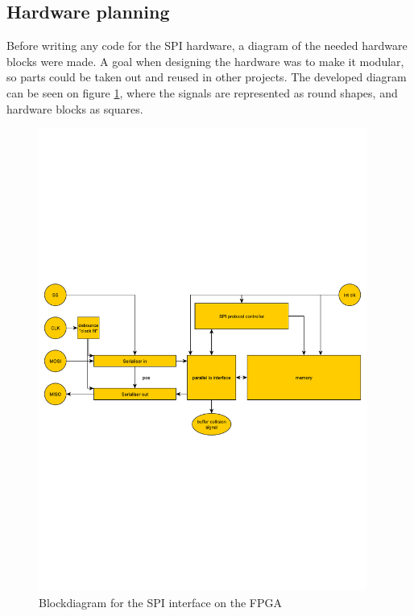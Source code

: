 \subsection{Hardware planning}
Before writing any code for the SPI hardware, a diagram of the needed hardware blocks were made. A goal when designing the hardware was to make it modular, so parts could be taken out and reused in other projects. The developed diagram can be seen on figure \ref{fig:spi_protocol_fpga_blocks_final_design}, where the signals are represented as round shapes, and hardware blocks as squares. 

\begin{figure}[htb] 
	\centering
  \includegraphics[width=0.96\textwidth,clip,trim=0 270 0 270]{graphics/spi_protocol_fpga_blocks_final_design.pdf}%
	\caption{Blockdiagram for the SPI interface on the FPGA}
	\label{fig:spi_protocol_fpga_blocks_final_design}			%
\end{figure}

